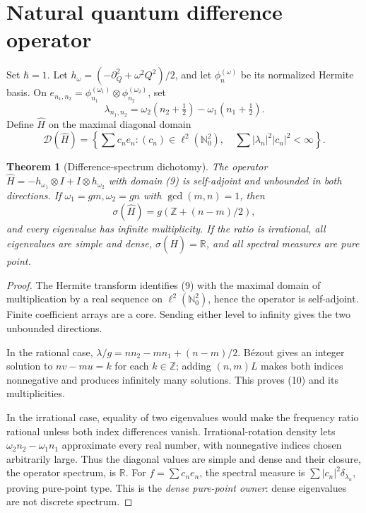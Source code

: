 \documentclass[10pt]{article}
\newtheorem{theorem}{Theorem}
\newcommand{\R}{\mathbb R}
\newcommand{\N}{\mathbb N}
\begin{document}
\section{Natural quantum difference operator}
Set \(\hbar=1\).  Let \(h_\omega=(-\partial_Q^2+\omega^2Q^2)/2\), and let
\(\phi_n^{(\omega)}\) be its normalized Hermite basis.  On
\(e_{n_1,n_2}=\phi_{n_1}^{(\omega_1)}\otimes\phi_{n_2}^{(\omega_2)}\), set
\begin{equation}
 \lambda_{n_1,n_2}=\omega _2(n_2+\tfrac12)-\omega _1(n_1+\tfrac12).
\end{equation}
Define \(\widehat H\) on the maximal diagonal domain
\begin{equation}
 \mathcal D(\widehat H)=\left\{\sum c_ne_n:
 (c_n)\in\ell^2(\mathbb N_0^2),\quad
 \sum |\lambda_n|^2|c_n|^2<\infty\right\}.
\end{equation}

\begin{theorem}[Difference-spectrum dichotomy]
The operator \(\widehat H=-h_{\omega_1}\otimes I+I\otimes h_{\omega_2}\)
with domain (9) is self-adjoint and unbounded in both directions.  If
\(\omega_1=gm,\omega_2=gn\) with \(\gcd(m,n)=1\), then
\begin{equation}
 \sigma(\widehat H)=g(\mathbb Z+(n-m)/2),
\end{equation}
and every eigenvalue has infinite multiplicity.  If the ratio is irrational,
all eigenvalues are simple and dense, \(\sigma(\widehat H)=\R\), and all
spectral measures are pure point.
\end{theorem}

\begin{proof}
The Hermite transform identifies (9) with the maximal domain of multiplication
by a real sequence on \(\ell^2(\N_0^2)\), hence the operator is self-adjoint.
Finite coefficient arrays are a core.  Sending either level to infinity gives
the two unbounded directions.

In the rational case,
\(\lambda/g=nn_2-mn_1+(n-m)/2\).  Bézout gives an integer solution to
\(nv-mu=k\) for each \(k\in\mathbb Z\); adding \((n,m)L\) makes both indices
nonnegative and produces infinitely many solutions.  This proves (10) and
its multiplicities.

In the irrational case, equality of two eigenvalues would make the frequency
ratio rational unless both index differences vanish.  Irrational-rotation
density lets \(\omega_2n_2-\omega_1n_1\) approximate every real number, with
nonnegative indices chosen arbitrarily large.  Thus the diagonal values are
simple and dense and their closure, the operator spectrum, is \(\R\).  For
\(f=\sum c_ne_n\), the spectral measure is
\(\sum |c_n|^2\delta_{\lambda_n}\), proving pure-point type.  This is the
\emph{dense pure-point owner}: dense eigenvalues are not discrete spectrum.
\end{proof}
\end{document}
